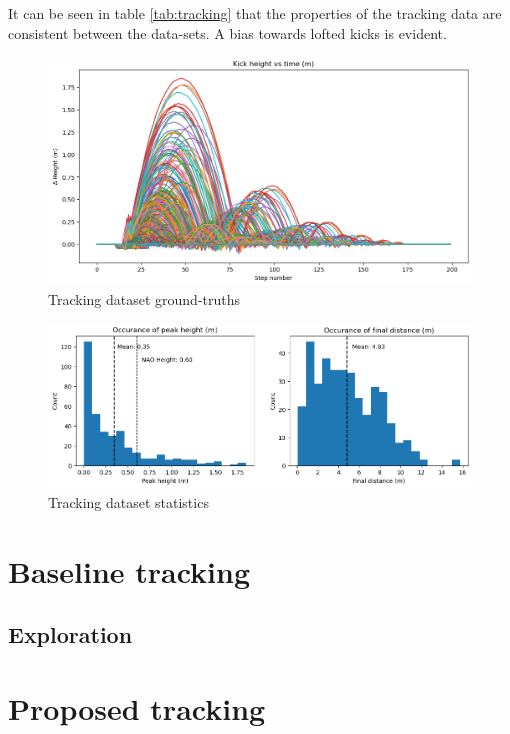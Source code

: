\documentclass[a4paper,twoside,12pt]{report}
\begin{document}
It can be seen in table \ref{tab:tracking} that the properties of the tracking data are consistent between the data-sets. A bias towards lofted kicks is evident.

\begin{figure}[h!]
\begin{center}
\includegraphics[width=12.5cm]{images/plotkicks.png}
\caption{Tracking dataset ground-truths}
\label{fig:plotkicks}
\end{center}
\end{figure}

\begin{figure}[h!]
\begin{center}
\includegraphics[width=14cm]{images/trackingplot.png}
\caption{Tracking dataset statistics}
\label{fig:trackplot}
\end{center}
\end{figure}

\section{Baseline tracking}

\subsection{Exploration}

\section{Proposed tracking}
\end{document}
